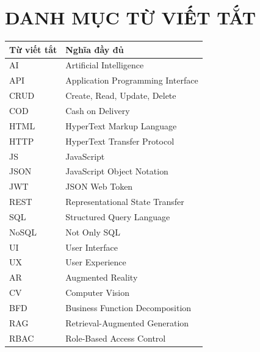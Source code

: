 \chapter*{DANH MỤC TỪ VIẾT TẮT}

\begin{table}[H]
\centering
\renewcommand{\arraystretch}{1.3}
\begin{tabular}{|p{4cm}|p{9cm}|}
\hline
\textbf{Từ viết tắt} & \textbf{Nghĩa đầy đủ} \\ \hline
AI & Artificial Intelligence \\ \hline
API & Application Programming Interface \\ \hline
CRUD & Create, Read, Update, Delete \\ \hline
COD & Cash on Delivery \\ \hline
HTML & HyperText Markup Language \\ \hline
HTTP & HyperText Transfer Protocol \\ \hline
JS & JavaScript \\ \hline
JSON & JavaScript Object Notation \\ \hline
JWT & JSON Web Token \\ \hline
REST & Representational State Transfer \\ \hline
SQL & Structured Query Language \\ \hline
NoSQL & Not Only SQL \\ \hline
UI & User Interface \\ \hline
UX & User Experience \\ \hline
AR & Augmented Reality \\ \hline
CV & Computer Vision \\ \hline
BFD & Business Function Decomposition \\ \hline
RAG & Retrieval-Augmented Generation \\ \hline
RBAC & Role-Based Access Control \\ \hline
\end{tabular}
\end{table}
